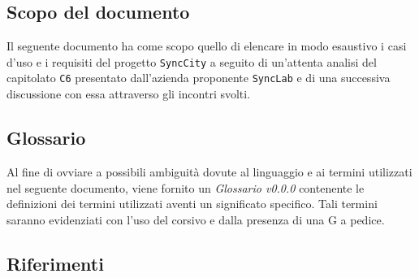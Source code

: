 \documentclass[8pt]{article}
\begin{document}
\subsection{Scopo del documento}
Il seguente documento ha come scopo quello di elencare in modo esaustivo i casi d'uso e i requisiti del progetto \texttt{SyncCity} a seguito di un'attenta analisi del capitolato \texttt{C6} presentato dall'azienda proponente \texttt{SyncLab} e di una successiva discussione con essa attraverso gli incontri svolti.

\subsection{Glossario}
Al fine di ovviare a possibili ambiguità dovute al linguaggio e ai termini utilizzati nel seguente documento, viene fornito un \textit{Glossario v0.0.0} contenente le definizioni dei termini utilizzati aventi un significato specifico. Tali termini saranno evidenziati con l'uso del corsivo e dalla presenza di una G a pedice.
\subsection{Riferimenti}
\end{document}
